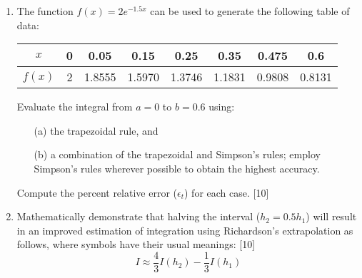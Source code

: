 \documentclass[12pt]{article}
\begin{document}
	\begin{enumerate}
		\item The function $f(x) = 2e^{-1.5x}$ can be used to generate the following table of data:
		
		\begin{center}
			\begin{tabular}{|c|ccccccc|}
				\hline
				$x$ & 0 & 0.05 & 0.15 & 0.25 & 0.35 & 0.475 & 0.6 \\
				\hline
				$f(x)$ & 2 & 1.8555 & 1.5970 & 1.3746 & 1.1831 & 0.9808 & 0.8131 \\
				\hline
			\end{tabular}
		\end{center}
		Evaluate the integral from $a=0$ to $b=0.6$ using:
		\begin{enumerate}
			\item[(a)] the trapezoidal rule, and
			\item[(b)] a combination of the trapezoidal and Simpson's rules; employ Simpson's rules wherever possible to obtain the highest accuracy.
		\end{enumerate}
		Compute the percent relative error ($\epsilon_t$) for each case. \hfill [10]
		
		\item Mathematically demonstrate that halving the interval ($h_2 = 0.5h_1$) will result in an improved estimation of integration using Richardson's extrapolation as follows, where symbols have their usual meanings: \hfill [10]
		\[ I \approx \frac{4}{3}I(h_2) - \frac{1}{3}I(h_1) \]
	\end{enumerate}
	
\end{document}
